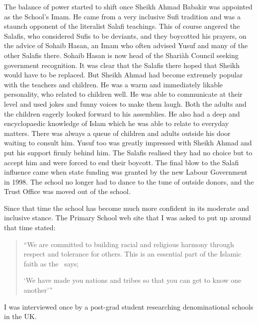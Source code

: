\documentclass[12pt]{memoir}
\begin{document}
The balance of power started to shift once Sheikh Ahmad Babakir
was appointed as the School’s Imam.
He came from a very inclusive Sufi tradition
and was a staunch opponent of the literalist Salafi teachings.
This of course angered the Salafis, who considered Sufis to be deviants,
and they boycotted his prayers, on the advice of Sohaib Hasan,
an Imam who often advised Yusuf and many of the other Salafis there.
Sohaib Hasan is now head of the Shari\`ah Council
seeking government recognition.
It was clear that the Salafis there hoped
that Sheikh  would have to be replaced.
But Sheikh Ahmad had become extremely popular
with the teachers and children.
He was a warm and immediately likable personality,
who related to children well.
He was able to communicate at their level
and used jokes and funny voices to make them laugh.
Both the adults and the children eagerly looked forward to his assemblies.
He also had a deep and encyclopaedic knowledge of Islam
which he was able to relate to everyday matters.
There was always a queue of children
and adults outside his door waiting to consult him.
Yusuf too was greatly impressed with Sheikh Ahmad
and put his support firmly behind him.
The Salafis realised they had no choice
but to accept him and were forced to end their boycott.
The final blow to the Salafi influence came
when state funding was granted by the new Labour Government in 1998.
The school no longer had to dance to the tune of outside donors,
and the Trust Office was moved out of the school.

Since that time the school has become much more confident
in its moderate and inclusive stance.
The Primary School web site that I was asked to put up around that time stated:

\begin{quote}
“We are committed to building racial and religious harmony
through respect and tolerance for others.
This is an essential part of the Islamic faith as the \Quran\ says;

‘We have made you nations and tribes so that you can get to know one another’”
\end{quote}

I was interviewed once by a post-grad student
researching denominational schools in the UK.
\end{document}

